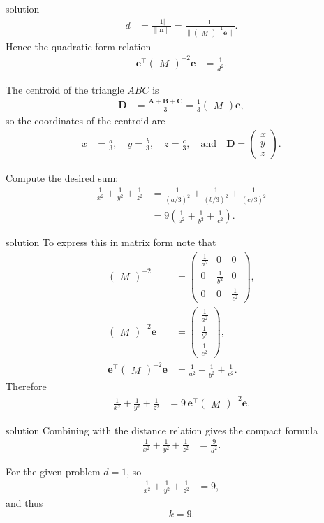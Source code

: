 \documentclass{beamer}
\numberwithin{equation}{section}
\theoremstyle{remark}
\newcommand{\myvec}[1]{\ensuremath{\begin{pmatrix}#1\end{pmatrix}}}
\let\vec\mathbf
\begin{document}
\begin{frame}{solution}
\begin{align}
d &= \frac{|1|}{\|\vec{n}\|}
= \frac{1}{\|\myvec{M}^{-1}\vec{e}\|}.
\end{align}
Hence the quadratic-form relation
\begin{align}
\vec{e}^\top \myvec{M}^{-2} \vec{e} &= \frac{1}{d^2}.
\end{align}

The centroid of the triangle \(ABC\) is
\begin{align}
\vec{D} &= \frac{\vec{A}+\vec{B}+\vec{C}}{3}
= \tfrac{1}{3}\myvec{M}\vec{e},
\end{align}
so the coordinates of the centroid are
\begin{align}
x &= \tfrac{a}{3}, \quad y=\tfrac{b}{3}, \quad z=\tfrac{c}{3},
\quad\text{and}\quad \vec{D}=\myvec{x\\y\\z}.
\end{align}

Compute the desired sum:
\begin{align}
\frac{1}{x^2}+\frac{1}{y^2}+\frac{1}{z^2}
&= \frac{1}{(a/3)^2}+\frac{1}{(b/3)^2}+\frac{1}{(c/3)^2} \\
&= 9\!\left(\frac{1}{a^2}+\frac{1}{b^2}+\frac{1}{c^2}\right).
\end{align}
\end{frame}
\begin{frame}{solution}
To express this in matrix form note that
\begin{align}
\myvec{M}^{-2} &= \myvec{\tfrac{1}{a^2}&0&0\\[4pt]0&\tfrac{1}{b^2}&0\\[4pt]0&0&\tfrac{1}{c^2}}, \\[6pt]
\myvec{M}^{-2}\vec{e} &= \myvec{\tfrac{1}{a^2}\\[4pt]\tfrac{1}{b^2}\\[4pt]\tfrac{1}{c^2}}, \\[6pt]
\vec{e}^\top \myvec{M}^{-2}\vec{e} &= \frac{1}{a^2}+\frac{1}{b^2}+\frac{1}{c^2}.
\end{align}
Therefore
\begin{align}
\frac{1}{x^2}+\frac{1}{y^2}+\frac{1}{z^2}
&= 9\,\vec{e}^\top \myvec{M}^{-2}\vec{e}.
\end{align}
\end{frame}
\begin{frame}{solution}
Combining with the distance relation gives the compact formula
\begin{align}
\frac{1}{x^2}+\frac{1}{y^2}+\frac{1}{z^2} &= \frac{9}{d^2}.
\end{align}

For the given problem \(d=1\), so
\begin{align}
\frac{1}{x^2}+\frac{1}{y^2}+\frac{1}{z^2} &= 9,
\end{align}
and thus
\[
\boxed{k=9}.
\]

\end{frame}
\end{document}
